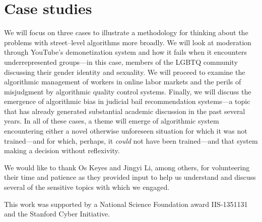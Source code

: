 \documentclass[sigchi]{acmart}
\newcommand{\topic}[1]{{\color{Blue}#1}} %
\renewcommand{\topic}[1]{#1} %
\begin{document}
\section{Case studies}
\topic{We will focus on three cases to illustrate a methodology for thinking about the problems with street--level algorithms more broadly.}
We will look at moderation through YouTube's demonetization system and how it fails when it encounters underrepresented groups---in this case, members of the LGBTQ community discussing their gender identity and sexuality.
We will proceed to examine the algorithmic management of workers in online labor markets and the perils of misjudgment by algorithmic quality control systems.
Finally, we will discuss the emergence of algorithmic bias in judicial bail recommendation systems---a topic that has already generated substantial academic discussion in the past several years.
In all of these cases, a theme will emerge of
algorithmic system encountering either a novel otherwise unforeseen situation for which it was not trained---and for which, perhaps, it \textit{could} not have been trained---and that system making a decision without reflexivity.









\begin{acks}
We would like to thank Os Keyes and Jingyi Li, among others, for volunteering their time and patience as they provided input to help us understand and discuss several of the sensitive topics with which we engaged.

This work was supported by a National Science Foundation award IIS-1351131 and the Stanford Cyber Initiative.

\end{acks}

\balance

\end{document}
